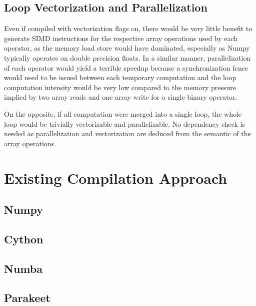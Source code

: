 \documentclass[10pt, preprint]{sigplanconf}
\begin{document}
\subsection{Loop Vectorization and Parallelization}

Even if compiled with vectorization flags on, there would be very little
benefit to generate SIMD instructions for the respective array operations used
by each operator, as the memory load store would have dominated, especially as
Numpy typically operates on double precision floats. In a similar manner,
parallelization of each operator would yield a terrible speedup because a
synchronization fence would need to be issued between each temporary
computation and the loop computation intensity would be very low compared to
the memory pressure implied by two array reads and one array write for a single
binary operator.

On the opposite, if all computation were merged into a single loop, the whole
loop would be trivially vectorizable and parallelizable. 
No dependency check is needed as parallelization and vectorization are deduced 
from the semantic of the array operations.

\section{Existing Compilation Approach}
\label{sec:compilers}

\subsection{Numpy}
\cite{oliphant2007,numpyarray2011}

\subsection{Cython}
\cite{cython2010}

\subsection{Numba}
\cite{numba}

\subsection{Parakeet}
\cite{parakeet2012}
\end{document}
